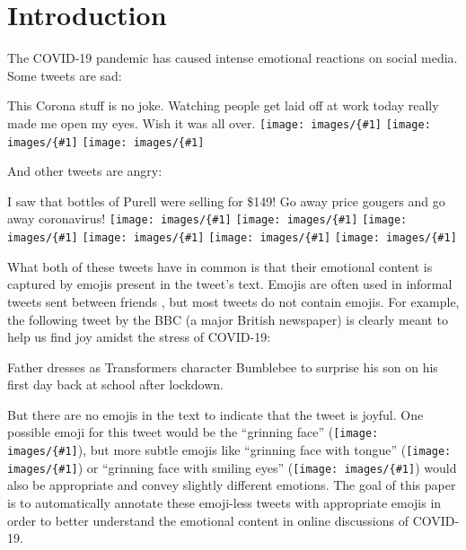 \documentclass[11pt]{article}
\newcommand{\XXX}{{\color{red}\textbf{XXX}}~}
\newcommand{\emoji}[1]{\texttt{[image: images/\{\#1]}}}
\DeclareMathOperator{\corona}{\texttt{TwitterCOVID}}
\begin{document}
\section{Introduction}
\label{sec:intro}

The COVID-19 pandemic has caused intense emotional reactions on social media.
Some tweets are sad:
\begin{displayquote}
    This Corona stuff is no joke. Watching people get laid off at work today really made me open my eyes. Wish it was all over. 
    \emoji{loudly-crying-face_1f62d} 
    \emoji{anguished-face_1f627}
    \emoji{folded-hands_1f64f}
\end{displayquote}
And other tweets are angry:
\begin{displayquote}
    I saw that bottles of Purell were selling for \$149! Go away price gougers and go away coronavirus! 
    \emoji{angry-face_1f620}
    \emoji{angry-face_1f620}
    \emoji{angry-face_1f620}
    \emoji{angry-face_1f620}
    \emoji{angry-face_1f620}
    \emoji{angry-face_1f620}
\end{displayquote}
What both of these tweets have in common is that their emotional content is captured by emojis present in the tweet's text.
Emojis are often used in informal tweets sent between friends \citep{marcel2016emoji},
but most tweets do not contain emojis.
For example, the following tweet by the BBC (a major British newspaper) is clearly meant to help us find joy amidst the stress of COVID-19:
\begin{displayquote}
    Father dresses as Transformers character Bumblebee to surprise his son on his first day back at school after lockdown.
\end{displayquote}
But there are no emojis in the text to indicate that the tweet is joyful.
One possible emoji for this tweet would be the ``grinning face'' (\emoji{grinning-face_1f600}),
but more subtle emojis like ``grinning face with tongue'' (\emoji{face-with-tongue_1f61b}) or ``grinning face with smiling eyes'' (\emoji{grinning-face-with-smiling-eyes_1f604}) would also be appropriate and convey slightly different emotions.
The goal of this paper is to automatically annotate these emoji-less tweets with appropriate emojis in order to better understand the emotional content in online discussions of COVID-19.
\end{document}
